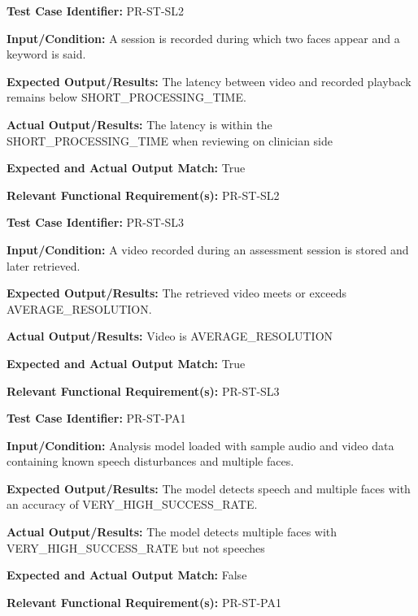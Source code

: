 \documentclass[12pt, titlepage]{article}
\begin{document}
\begin{mdframed}[linewidth=0.5mm]
  \textbf{Test Case Identifier:} PR-ST-SL2 \par
  \textbf{Input/Condition:} A session is recorded during which two faces appear and a keyword is said. \par
  \textbf{Expected Output/Results:} The latency between video and recorded playback remains below SHORT\_PROCESSING\_TIME. \par
  \textbf{Actual Output/Results:} The latency is within the \\SHORT\_PROCESSING\_TIME when reviewing on clinician side \par
  \textbf{Expected and Actual Output Match:} True \par
  \textbf{Relevant Functional Requirement(s):} PR-ST-SL2
\end{mdframed}

\begin{mdframed}[linewidth=0.5mm]
  \textbf{Test Case Identifier:} PR-ST-SL3 \par
  \textbf{Input/Condition:} A video recorded during an assessment session is stored and later retrieved. \par
  \textbf{Expected Output/Results:} The retrieved video meets or exceeds AVERAGE\_RESOLUTION. \par
  \textbf{Actual Output/Results:} Video is AVERAGE\_RESOLUTION\par
  \textbf{Expected and Actual Output Match:} True \par
  \textbf{Relevant Functional Requirement(s):} PR-ST-SL3
\end{mdframed}

\begin{mdframed}[linewidth=0.5mm]
  \textbf{Test Case Identifier:} PR-ST-PA1\par
  \textbf{Input/Condition:} Analysis model loaded with sample audio and video data containing known speech disturbances and multiple faces. \par
  \textbf{Expected Output/Results:} The model detects speech and multiple faces with an accuracy of VERY\_HIGH\_SUCCESS\_RATE. \par
  \textbf{Actual Output/Results:} The model detects multiple faces with \\VERY\_HIGH\_SUCCESS\_RATE but not speeches \par
  \textbf{Expected and Actual Output Match:} False \par
  \textbf{Relevant Functional Requirement(s):} PR-ST-PA1
\end{mdframed}
\end{document}
